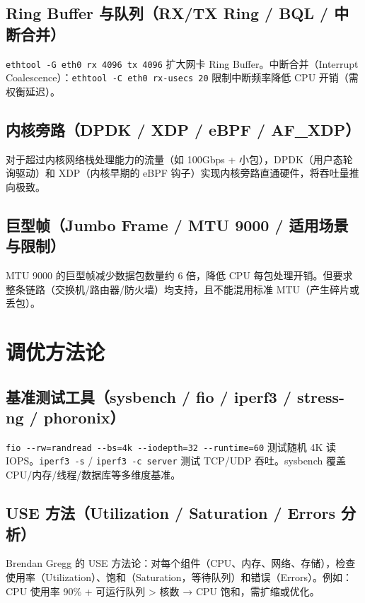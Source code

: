 \documentclass[12pt,UTF8]{ctexbook}
\begin{document}
    \subsection{Ring Buffer 与队列（RX/TX Ring / BQL / 中断合并）}

\verb|ethtool -G eth0 rx 4096 tx 4096| 扩大网卡 Ring Buffer。中断合并（Interrupt Coalescence）：\verb|ethtool -C eth0 rx-usecs 20| 限制中断频率降低 CPU 开销（需权衡延迟）。

    \subsection{内核旁路（DPDK / XDP / eBPF / AF\_XDP）}

对于超过内核网络栈处理能力的流量（如 100Gbps + 小包），DPDK（用户态轮询驱动）和 XDP（内核早期的 eBPF 钩子）实现内核旁路直通硬件，将吞吐量推向极致。

    \subsection{巨型帧（Jumbo Frame / MTU 9000 / 适用场景与限制）}

MTU 9000 的巨型帧减少数据包数量约 6 倍，降低 CPU 每包处理开销。但要求整条链路（交换机/路由器/防火墙）均支持，且不能混用标准 MTU（产生碎片或丢包）。

  \section{调优方法论}
    \subsection{基准测试工具（sysbench / fio / iperf3 / stress-ng / phoronix）}

\verb|fio --rw=randread --bs=4k --iodepth=32 --runtime=60| 测试随机 4K 读 IOPS。\verb|iperf3 -s| / \verb|iperf3 -c server| 测试 TCP/UDP 吞吐。sysbench 覆盖 CPU/内存/线程/数据库等多维度基准。

    \subsection{USE 方法（Utilization / Saturation / Errors 分析）}

Brendan Gregg 的 USE 方法论：对每个组件（CPU、内存、网络、存储），检查使用率（Utilization）、饱和（Saturation，等待队列）和错误（Errors）。例如：CPU 使用率 90\% + 可运行队列 > 核数 → CPU 饱和，需扩缩或优化。
\end{document}
